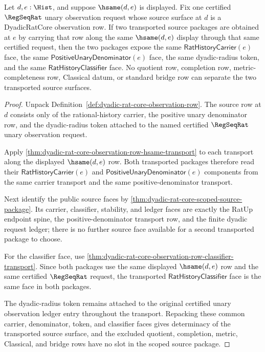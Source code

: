\begin{theorem}
\label{thm:dyadic-observation-source-transport-determinacy}
Let $d,e:\Hist$, and suppose $\hsame(d,e)$ is displayed. Fix one certified
$\RegSeqRat$ unary observation request whose source surface at $d$ is a
DyadicRatCore observation row. If two transported source packages are obtained
at $e$ by carrying that row along the same $\hsame(d,e)$ display through that
same certified request, then the two packages expose the same
$\mathsf{RatHistoryCarrier}(e)$ face, the same
$\mathsf{PositiveUnaryDenominator}(e)$ face, the same dyadic-radius token, and
the same $\mathsf{RatHistoryClassifier}$ face. No quotient row, completion row,
metric-completeness row, Classical datum, or standard bridge row can separate
the two transported source surfaces.
\end{theorem}
\begin{proof}
Unpack Definition~\ref{def:dyadic-rat-core-observation-row}. The source row at
$d$ consists only of the rational-history carrier, the positive unary
denominator row, and the dyadic-radius token attached to the named certified
$\RegSeqRat$ unary observation request.

Apply \autoref{thm:dyadic-rat-core-observation-row-hsame-transport} to each
transport along the displayed $\hsame(d,e)$ row. Both transported packages
therefore read their $\mathsf{RatHistoryCarrier}(e)$ and
$\mathsf{PositiveUnaryDenominator}(e)$ components from the same carrier
transport and the same positive-denominator transport.

Next identify the public source faces by
\autoref{thm:dyadic-rat-core-scoped-source-package}. Its carrier,
classifier, stability, and ledger faces are exactly the RatUp endpoint spine,
the positive-denominator transport row, and the finite dyadic request ledger;
there is no further source face available for a second transported package to
choose.

For the classifier face, use
\autoref{thm:dyadic-rat-core-observation-row-classifier-transport}. Since both
packages use the same displayed $\hsame(d,e)$ row and the same certified
$\RegSeqRat$ request, the transported $\mathsf{RatHistoryClassifier}$ face is
the same face in both packages.

The dyadic-radius token remains attached to the original certified unary
observation ledger entry throughout the transport. Repacking these common
carrier, denominator, token, and classifier faces gives determinacy of the
transported source surface, and the excluded quotient, completion, metric,
Classical, and bridge rows have no slot in the scoped source package.
\end{proof}

